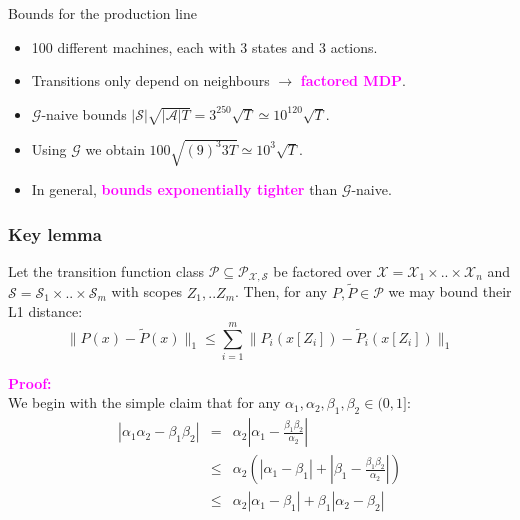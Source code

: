 \documentclass{beamer}
\newlength{\wideitemsep}
\let\olditem\item
\renewcommand{\item}{\setlength{\itemsep}{\wideitemsep}\olditem}
\newcommand{\Xc}{\mathcal{X}}
\newcommand{\Pc}{\mathcal{P}}
\newcommand{\Gc}{\mathcal{G}}
\newcommand{\Sc}{\mathcal{S}}
\newcommand{\Ac}{\mathcal{A}}
\newcommand{\bspace}{\vspace{3mm}}
\newcommand{\hilite}[1]{\textcolor{magenta}{\textbf{#1}}}
\begin{document}
\begin{frame}{Bounds for the production line}
\begin{itemize}
    \item 100 different machines, each with 3 states and 3 actions.
    \bspace
    \item Transitions only depend on neighbours $\rightarrow$ \hilite{factored MDP}.
    \bspace
    \item $\Gc$-naive bounds $|\Sc| \sqrt{|\Ac|T} = 3^{250}\sqrt{T} \simeq 10^{120} \sqrt{T}$.
    \bspace
    \item Using $\Gc$ we obtain $ 100 \sqrt{(9)^3 3 T} \simeq 10^3 \sqrt{T}$.
    \bspace
    \item In general, \hilite{bounds exponentially tighter} than $\Gc$-naive.

\end{itemize}
\end{frame}



\begin{frame}
\frametitle{Key lemma}
\begin{lemma}
Let the transition function class $\Pc \subseteq \Pc_{\Xc,\Sc}$ be factored over $\Xc = \Xc_1 \times .. \times \Xc_n$ and $\Sc = \Sc_1 \times .. \times \Sc_m$ with scopes  $Z_1, .. Z_m$.
Then, for any $P,\tilde{P} \in \Pc$ we may bound their L1 distance:
$$ \| P(x) - \tilde{P}(x) \|_1 \le \sum_{i=1}^m \|P_i(x[Z_i]) - \tilde{P}_i(x[Z_i]) \|_1 $$
\end{lemma}
\hilite{Proof:}\\
We begin with the simple claim that for any $ \alpha_1, \alpha_2, \beta_1, \beta_2 \in (0,1]$:
\begin{eqnarray*}
    | \alpha_1 \alpha_2 - \beta_1 \beta_2 | &=& \alpha_2 \left| \alpha_1 - \frac{\beta_1 \beta_2}{\alpha_2} \right| \\
    &\le& \alpha_2 \left( \left|\alpha_1 - \beta_1 \right| + \left|\beta_1 - \frac{\beta_1 \beta_2}{\alpha_2} \right| \right) \\
    &\le& \alpha_2 \left| \alpha_1 - \beta_1 \right| + \beta_1 \left| \alpha_2 - \beta_2 \right|
\end{eqnarray*}
\end{frame}
\end{document}
